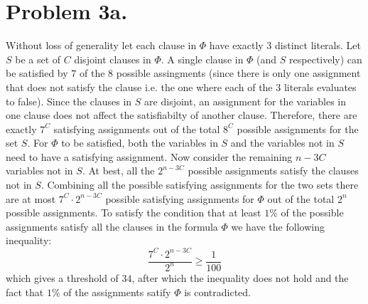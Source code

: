\documentclass[12pt]{article}
\begin{document}
\pagestyle{plain}
\titleformat{\subsection}[runin]
  {\normalfont\large\bfseries}{\thesubsection}{1em}{}
\titleformat{\subsubsection}[runin]
  {\normalfont\large\bfseries}{\thesubsubsection}{1em}{}

\section*{Problem 3a.}
Without loss of generality let each clause in $\Phi$ have exactly $3$
distinct literals. Let $S$ be a set of $C$ disjoint clauses in $\Phi$.
A single clause in $\Phi$ (and $S$ respectively) can be satisfied by $7$ of the
$8$ possible assingments (since there is only one assignment that does
not satisfy the clause i.e. the one where each of the $3$ literals evaluates to
false). Since the clauses in $S$ are disjoint, an assignment for the variables
in one clause does not affect the satisfiabilty of another clause. Therefore,
there are exactly $7^C$ satisfying assignments out of the total $8^C$ possible
assignments for the set $S$. For $\Phi$ to be satisfied, both the variables in
$S$ and the variables not in $S$ need to have a satisfying assignment. Now
consider the remaining $n-3C$ variables not in $S$. At best, all the $2^{n-3C}$
possible assignments satisfy the clauses not in $S$. Combining all the possible
satisfying assignments for the two sets there are at most $7^C \cdot 2^{n-3C}$
possible satisfying assignments for $\Phi$ out of the total $2^n$ possible
assignments. To satisfy the condition that at least $1\%$ of the possible
assignments satisfy all the clauses in the formula $\Phi$ we have the following
inequality:
$$\frac{7^C \cdot 2^{n-3C}}{2^n} \ge \frac{1}{100} $$
which gives a threshold of $34$, after which the inequality does not hold
and the fact that $1\%$ of the assignments satify $\Phi$ is contradicted.
\end{document}
